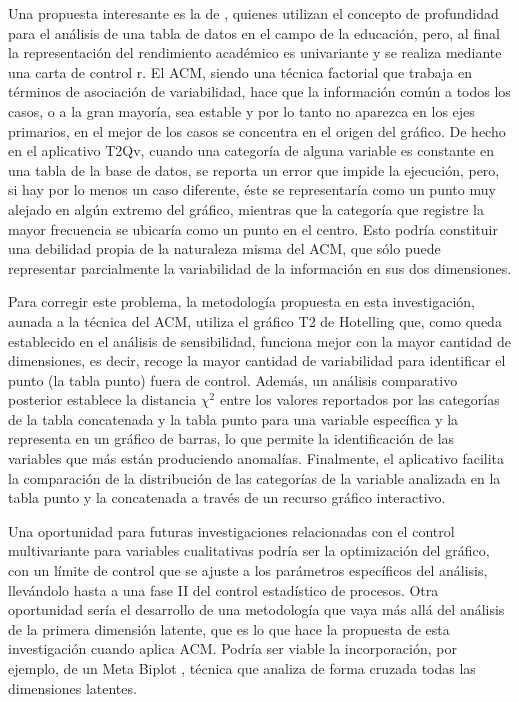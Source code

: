 \documentclass[mathematics,article,submit,moreauthors,pdftex]{mdpi}
\begin{document}
Una propuesta interesante es la de \citet{Saltos2020}, quienes utilizan
el concepto de profundidad para el análisis de una tabla de datos en el
campo de la educación, pero, al final la representación del rendimiento
académico es univariante y se realiza mediante una carta de control r.
El ACM, siendo una técnica factorial que trabaja en términos de
asociación de variabilidad, hace que la información común a todos los
casos, o a la gran mayoría, sea estable y por lo tanto no aparezca en
los ejes primarios, en el mejor de los casos se concentra en el origen
del gráfico. De hecho en el aplicativo T2Qv, cuando una categoría de
alguna variable es constante en una tabla de la base de datos, se
reporta un error que impide la ejecución, pero, si hay por lo menos un
caso diferente, éste se representaría como un punto muy alejado en algún
extremo del gráfico, mientras que la categoría que registre la mayor
frecuencia se ubicaría como un punto en el centro. Esto podría
constituir una debilidad propia de la naturaleza misma del ACM, que sólo
puede representar parcialmente la variabilidad de la información en sus
dos dimensiones.

Para corregir este problema, la metodología propuesta en esta
investigación, aunada a la técnica del ACM, utiliza el gráfico T2 de
Hotelling que, como queda establecido en el análisis de sensibilidad,
funciona mejor con la mayor cantidad de dimensiones, es decir, recoge la
mayor cantidad de variabilidad para identificar el punto (la tabla
punto) fuera de control. Además, un análisis comparativo posterior
establece la distancia \(\chi^{2}\) entre los valores reportados por las
categorías de la tabla concatenada y la tabla punto para una variable
específica y la representa en un gráfico de barras, lo que permite la
identificación de las variables que más están produciendo anomalías.
Finalmente, el aplicativo facilita la comparación de la distribución de
las categorías de la variable analizada en la tabla punto y la
concatenada a través de un recurso gráfico interactivo.

Una oportunidad para futuras investigaciones relacionadas con el control
multivariante para variables cualitativas podría ser la optimización del
gráfico, con un límite de control que se ajuste a los parámetros
específicos del análisis, llevándolo hasta a una fase II del control
estadístico de procesos. Otra oportunidad sería el desarrollo de una
metodología que vaya más allá del análisis de la primera dimensión
latente, que es lo que hace la propuesta de esta investigación cuando
aplica ACM. Podría ser viable la incorporación, por ejemplo, de un Meta
Biplot \citep{galindojk} , técnica que analiza de forma cruzada todas
las dimensiones latentes.
\end{document}
